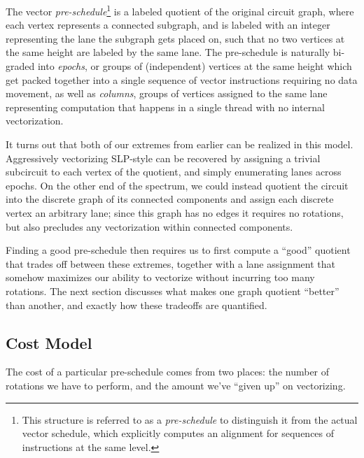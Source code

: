The vector {\em pre-schedule}\footnote{This structure is referred to as a {\em pre-schedule} to distinguish it from the actual vector schedule, which explicitly computes an alignment for sequences of instructions at the same level. %
} is a labeled quotient of the original circuit graph, where each vertex represents a connected subgraph, and is labeled with an integer representing the lane the subgraph gets placed on, such that no two vertices at the same height are labeled by the same lane.
The pre-schedule is naturally bi-graded into {\em epochs}, or groups of (independent) vertices at the same height which get packed together into a single sequence of vector instructions requiring no data movement, as well as {\em columns}, groups of vertices assigned to the same lane representing computation that happens in a single thread with no internal vectorization.

It turns out that both of our extremes from earlier can be realized in this model.
Aggressively vectorizing SLP-style can be recovered by assigning a trivial subcircuit to each vertex of the quotient, and simply enumerating lanes across epochs.
On the other end of the spectrum, we could instead quotient the circuit into the discrete graph of its connected components and assign each discrete vertex an arbitrary lane; since this graph has no edges it requires no rotations, but also precludes any vectorization within connected components.

Finding a good pre-schedule then requires us to first compute a ``good'' quotient that trades off between these extremes, together with a lane assignment that somehow maximizes our ability to vectorize without incurring too many rotations.
The next section discusses what makes one graph quotient ``better'' than another, and exactly how these tradeoffs are quantified.

\subsection{Cost Model}\label{sec:cost-model}
The cost of a particular pre-schedule comes from two places: the number of rotations we have to perform, and the amount we've ``given up'' on vectorizing.
